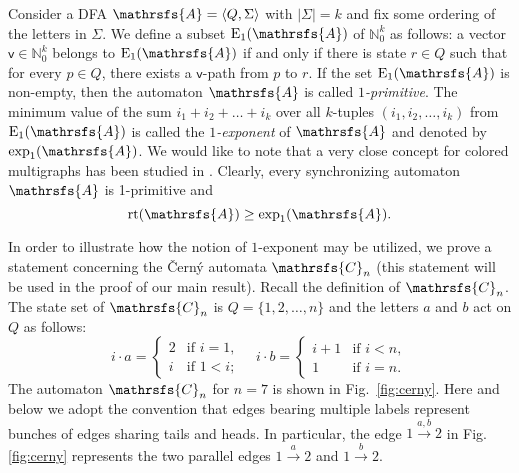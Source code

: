 \documentclass[11pt]{llncs}
\DeclareMathOperator{\rt}{rt}
\begin{document}
Consider a DFA $\mathrsfs{A} = \langle Q, \Sigma \rangle$ with $|\Sigma| = k$
and fix some ordering of the letters in $\Sigma$. We define a subset
$\mathrm{E}_1(\mathrsfs{A})$ of $\mathbb{N}^{k}_0$ as follows: a vector
$\mathsf{v} \in \mathbb{N}^{k}_0$ belongs to $\mathrm{E}_1(\mathrsfs{A})$ if
and only if there is state $r \in Q$ such that for every $p \in Q$, there
exists a $\mathsf{v}$-path from $p$ to $r$. If the set
$\mathrm{E}_1(\mathrsfs{A})$ is non-empty, then the automaton $\mathrsfs{A}$ is
called \emph{$1$-primitive}. The minimum value of the sum $i_1 + i_2 + \dots +
i_k$ over all $k$-tuples $(i_1, i_2, \ldots, i_k)$ from
$\mathrm{E}_1(\mathrsfs{A})$ is called the \emph{$1$-exponent} of
$\mathrsfs{A}$ and denoted by $\exp_1(\mathrsfs{A})$. We would like to note
that a very close concept for colored multigraphs has been studied in
\cite{ShSu03,OlShDr02}. Clearly, every synchronizing automaton $\mathrsfs{A}$
is 1-primitive and
\begin{equation}
\label{third inequality} \rt(\mathrsfs{A})\geq \exp_1(\mathrsfs{A}).
\end{equation}

In order to illustrate how the notion of $1$-exponent may be utilized, we prove
a statement concerning the \v{C}ern\'{y} automata $\mathrsfs{C}_n$ (this
statement will be used in the proof of our main result). Recall the definition
of $\mathrsfs{C}_n$. The state set of $\mathrsfs{C}_n$ is $Q=\{1,2,\dots,n\}$
and the letters $a$ and $b$ act on $Q$ as follows:
$$i \cdot a =\begin{cases}
2 &\text{if } i = 1,\\
i &\text{if } 1 < i;
\end{cases}\quad
i \cdot b =\begin{cases}
i+1 &\text{if } i<n,\\
1 &\text{if } i=n.
\end{cases}$$
The automaton $\mathrsfs{C}_n$ for $n = 7$ is shown in Fig.~\ref{fig:cerny}.
Here and below we adopt the convention that edges bearing multiple labels
represent bunches of edges sharing tails and heads. In particular, the edge
$1\xrightarrow{a,b}2$ in Fig.\,\ref{fig:cerny} represents the two parallel
edges $1\xrightarrow{a}2$ and $1\xrightarrow{b}2$.
\end{document}
